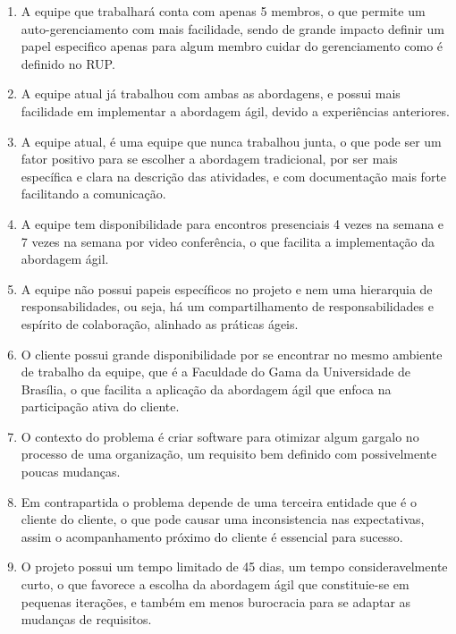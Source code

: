 \begin{enumerate}
  \item A equipe que trabalhará conta com apenas 5 membros, o que permite um
  auto-gerenciamento com mais facilidade, sendo de grande impacto definir um
  papel especifico apenas para algum membro cuidar do gerenciamento como é definido no RUP.
  \item A equipe atual já trabalhou com ambas as abordagens, e possui mais facilidade
  em implementar a abordagem ágil, devido a experiências anteriores.
  \item A equipe atual, é uma equipe que nunca trabalhou junta, o que pode ser um
  fator positivo para se escolher a abordagem tradicional, por ser mais específica
  e clara na descrição das atividades, e com documentação mais forte facilitando a comunicação.
  \item A equipe tem disponibilidade para encontros presenciais 4 vezes na semana
  e 7 vezes na semana por video conferência, o que facilita a implementação da abordagem ágil.
  \item A equipe não possui papeis específicos no projeto e nem uma hierarquia de
  responsabilidades, ou seja, há um compartilhamento de responsabilidades e espírito
  de colaboração, alinhado as práticas ágeis.
  \item O cliente possui grande disponibilidade por se encontrar no mesmo ambiente
  de trabalho da equipe, que é a Faculdade do Gama da Universidade de Brasília,
  o que facilita a aplicação da abordagem ágil que enfoca na participação ativa do cliente.
  \item O contexto do problema é criar software para otimizar algum gargalo no processo
  de uma organização, um requisito bem definido com possivelmente poucas mudanças.
  \item Em contrapartida o problema depende de uma terceira entidade que é o cliente
  do cliente, o que pode causar uma inconsistencia nas expectativas, assim o acompanhamento
  próximo do cliente é essencial para sucesso.
  \item O projeto possui um tempo limitado de 45 dias, um tempo consideravelmente curto,
  o que favorece a escolha da abordagem ágil que constituie-se em pequenas iterações,
  e também em menos burocracia para se adaptar as mudanças de requisitos.
\end{enumerate}
